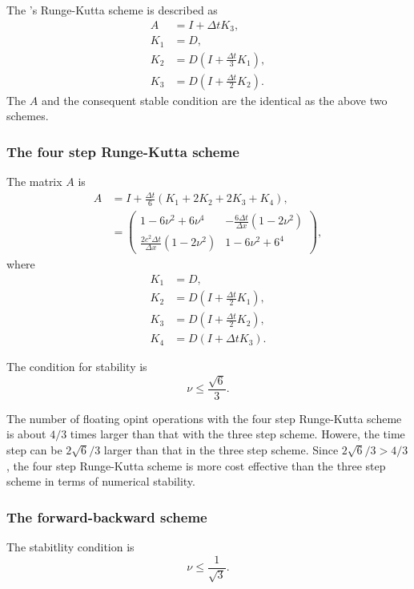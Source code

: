 The \citet{Wicker_2002}'s Runge-Kutta scheme is described as
\begin{align}
  A &= I + \Delta t K_3, \\
  K_1 &= D, \\
  K_2 &= D \left(I + \frac{\Delta t}{3}K_1\right), \\
  K_3 &= D \left(I + \frac{\Delta t}{2}K_2\right).
\end{align}
The $A$ and the consequent stable condition are the identical as the above two schemes.


\subsubsection{The four step Runge-Kutta scheme}
The matrix $A$ is
\begin{align}
  A &= I + \frac{\Delta t}{6}(K_1 + 2K_2 + 2K_3 + K_4), \\
  &= \begin{pmatrix}
    1-6\nu^2+6\nu^4 & -\frac{6\Delta t}{\Delta x}(1-2\nu^2) \\
    \frac{2c^2\Delta t}{\Delta x}(1-2\nu^2) & 1-6\nu^2+6^4
  \end{pmatrix},
\end{align}
where
\begin{align}
  K_1 &= D, \\
  K_2 &= D \left(I + \frac{\Delta t}{2}K_1\right), \\
  K_3 &= D \left(I + \frac{\Delta t}{2}K_2\right), \\
  K_4 &= D (I + \Delta t K_3).
\end{align}

The condition for stability is
\begin{equation}
  \nu \le \frac{\sqrt{6}}{3}.
\end{equation}

The number of floating opint operations with the four step Runge-Kutta scheme is about $4/3$ times larger than that with the three step scheme.
Howere, the time step can be $2\sqrt{6}/3$ larger than that in the three step scheme.
Since $2\sqrt{6}/3 > 4/3$, the four step Runge-Kutta scheme is more cost effective than the three step scheme in terms of numerical stability.


\subsubsection{The forward-backward scheme}
The stabitlity condition is
\begin{equation}
  \nu \le \frac{1}{\sqrt{3}}.
\end{equation}

